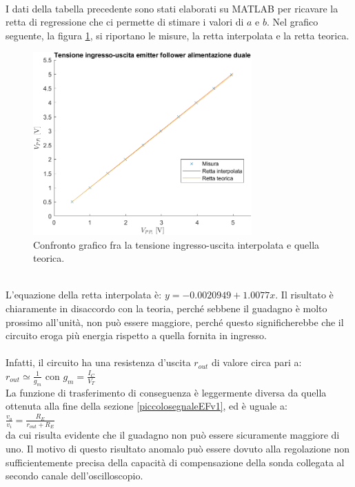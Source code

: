 \documentclass{report}
\begin{document}
\\I dati della tabella precedente sono stati elaborati su MATLAB per ricavare la retta di regressione che ci permette di stimare i valori di $a$ e $b$. Nel grafico seguente, la figura \ref{figura:graficoEFv1}, si riportano le misure, la retta interpolata e la retta teorica. 
\begin{figure}[h]
\centering
\includegraphics[height=7cm]{immagini/graficoEFv1}
\caption{Confronto grafico fra la tensione ingresso-uscita interpolata e quella teorica.}
\label{figura:graficoEFv1}
\end{figure}
\\L'equazione della retta interpolata è: $y=-0.0020949+1.0077x$. Il risultato è chiaramente in disaccordo con la teoria, perché sebbene il guadagno è molto prossimo all'unità, non può essere maggiore, perché questo significherebbe che il circuito eroga più energia rispetto a quella fornita in ingresso. \\\\ Infatti, il circuito ha una resistenza d'uscita $r_{out}$ di valore circa pari a:
\\[2pt]\indent$\displaystyle{r_{out}\simeq\frac{1}{g_m}}$ \indent con  $\displaystyle{g_m=\frac{I_C}{V_T}}$
\\[2pt]La funzione di trasferimento di conseguenza è leggermente diversa da quella ottenuta alla fine della sezione \ref{piccolosegnaleEFv1}, ed è uguale a:
\\[2pt]\indent $\displaystyle{\frac{v_o}{v_i}=\frac{R_E}{r_{out}+R_E}}$
\\[2pt]da cui risulta evidente che il guadagno non può essere sicuramente maggiore di uno. Il motivo di questo risultato anomalo può essere dovuto alla regolazione non sufficientemente precisa della capacità di compensazione della sonda collegata al secondo canale dell'oscilloscopio.
\end{document}

